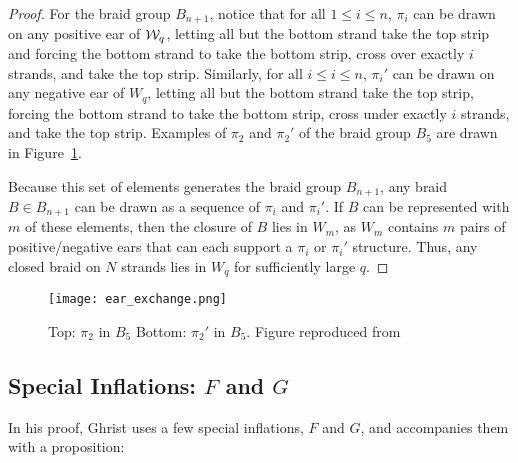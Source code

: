 \documentclass[paper.tex]{subfiles}
\begin{document}
\begin{proof}

    For the braid group $B_{n+1}$, notice that for all $1 \leq i \leq n$, $\pi_i$ can be drawn on any positive ear of $\mathcal{W}_q$, letting all but the bottom strand take the top strip and forcing the bottom strand to take the bottom strip, cross over exactly $i$ strands, and take the top strip. Similarly, for all $i \leq i \leq n$, $\pi_i'$ can be drawn on any negative ear of $W_q$, letting all but the bottom strand take the top strip, forcing the bottom strand to take the bottom strip, cross under exactly $i$ strands, and take the top strip. Examples of $\pi_2$ and $\pi_2'$ of the braid group $B_5$ are drawn in Figure~\ref{fig:earexchange}.

    Because this set of elements generates the braid group $B_{n+1}$, any braid $B \in B_{n+1}$ can be drawn as a sequence of $\pi_i$ and $\pi_i'$. If $B$ can be represented with $m$ of these elements, then the closure of $B$ lies in $W_m$, as $W_m$ contains $m$ pairs of positive/negative ears that can each support a $\pi_i$ or $\pi_i'$ structure. Thus, any closed braid on $N$ strands lies in $W_q$ for sufficiently large $q$.

\end{proof}



\begin{figure}[h]
  \centering
  \texttt{[image: ear\_exchange.png]}
  \caption{Top: $\pi_2$ in $B_5$ Bottom: $\pi_2'$ in $B_5$. Figure reproduced from~\cite{Ghrist1996}}\label{fig:earexchange}
\end{figure}








\subsection{Special Inflations: $F$ and $G$}

In his proof, Ghrist uses a few special inflations, $F$ and $G$, and accompanies them with a proposition:
\end{document}
